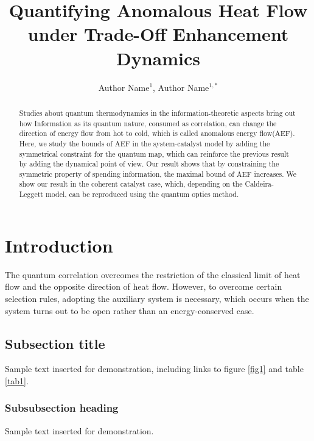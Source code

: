 \documentclass{iopjournal}
\begin{document}

\title{Quantifying Anomalous Heat Flow under Trade-Off Enhancement Dynamics}

\author{Author Name$^1$, Author Name$^{1,*}$}





\begin{abstract}
Studies about quantum thermodynamics in the information-theoretic aspects bring out how Information as its quantum nature, 
consumed as correlation, can change the direction of energy flow from hot to cold, which is called anomalous energy flow(AEF). 
Here, we study the bounds of AEF in the system-catalyst model by adding the symmetrical constraint for the quantum map, 
which can reinforce the previous result by adding the dynamical point of view. 
Our result shows that by constraining the symmetric property of spending information, 
the maximal bound of AEF increases. We show our result in the coherent catalyst case, 
which, depending on the Caldeira-Leggett model, can be reproduced using the quantum optics method.
\end{abstract}

\section{Introduction}

The quantum correlation overcomes the restriction of the classical limit of heat flow and the opposite direction of heat flow. However, to overcome certain selection rules, 
adopting the auxiliary system is necessary, which occurs when the system turns out to be open rather than an energy-conserved case.
\subsection{Subsection title}
Sample text inserted for demonstration, including links to figure \ref{fig1} and table \ref{tab1}.

\subsubsection{Subsubsection heading}
Sample text inserted for demonstration.
\end{document}

